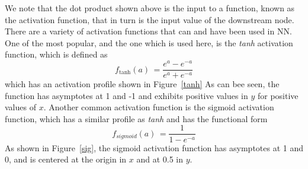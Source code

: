\documentclass[letterpaper,12pt]{article}
\newcommand{\figref}[1]{Figure~\ref{#1}}
\begin{document}
We note that the dot product shown above is the input to a function, known as the activation function, that in turn is the input value of the downstream node. There are a variety of activation functions that can and have been used in NN. One of the most popular, and the one which is used here, is the \textit{tanh} activation function, which is defined as
\begin{equation}
f_{\text{tanh}}(a) \, = \frac{e^a-e^{-a}}{e^a+e^{-a}}
\end{equation}
which has an activation profile shown in \figref{tanh} As can bee seen, the function has asymptotes  at 1 and -1 and exhibits positive values in $y$ for positive values of $x$. Another common activation function is the sigmoid activation function, which has a similar profile as \textit{tanh} and has the functional form
\begin{equation}
f_{sigmoid}(a) \, = \frac{1}{1-e^{-a}}
\end{equation}
As shown in \figref{sig}, the sigmoid activation function has asymptotes at 1 and 0, and is centered at the origin in $x$ and at 0.5 in $y$. 
\end{document}

